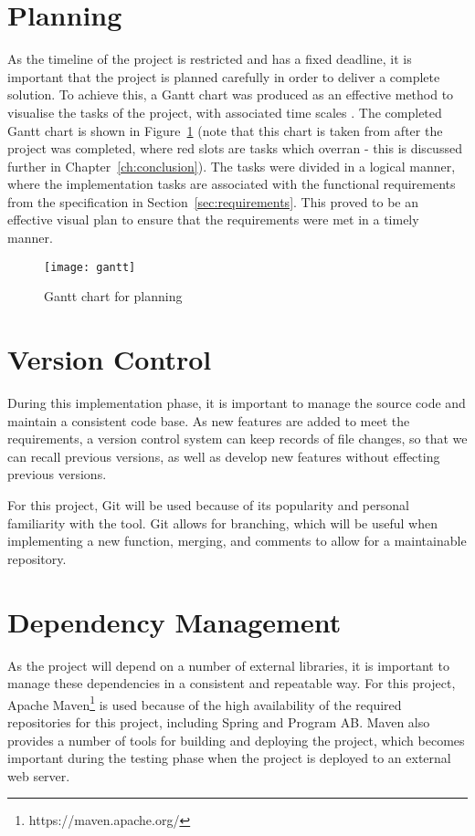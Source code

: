 \section{Planning}
As the timeline of the project is restricted and has a fixed deadline, it is important that the project is planned carefully in order to deliver a complete solution. To achieve this, a Gantt chart was produced as an effective method to visualise the tasks of the project, with associated time scales \cite{wilson2003gantt}. The completed Gantt chart is shown in Figure~\ref{fig:gantt} (note that this chart is taken from after the project was completed, where red slots are tasks which overran - this is discussed further in Chapter~\ref{ch:conclusion}). The tasks were divided in a logical manner, where the implementation tasks are associated with the functional requirements from the specification in Section~\ref{sec:requirements}. This proved to be an effective visual plan to ensure that the requirements were met in a timely manner.

\begin{landscape}
	\begin{figure}[h]
		\centering
		\texttt{[image: gantt]}
		\caption{Gantt chart for planning}
		\label{fig:gantt}
	\end{figure}
\end{landscape}

\section{Version Control}
During this implementation phase, it is important to manage the source code and maintain a consistent code base. As new features are added to meet the requirements, a version control system can keep records of file changes, so that we can recall previous versions, as well as develop new features without effecting previous versions.

For this project, Git will be used because of its popularity and personal familiarity with the tool. Git allows for branching, which will be useful when implementing a new function, merging, and comments to allow for a maintainable repository.

\section{Dependency Management}
As the project will depend on a number of external libraries, it is important to manage these dependencies in a consistent and repeatable way. For this project, Apache Maven\footnote{https://maven.apache.org/} is used because of the high availability of the required repositories for this project, including Spring and Program AB. Maven also provides a number of tools for building and deploying the project, which becomes important during the testing phase when the project is deployed to an external web server.

